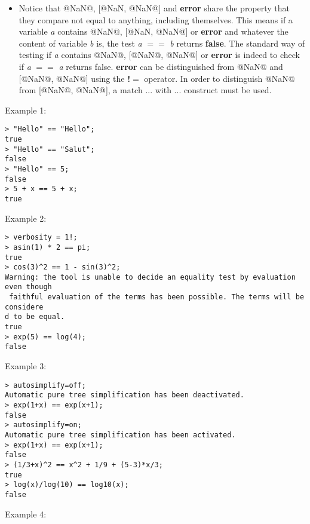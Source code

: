 \begin{itemize}
\item Notice that @NaN@, [@NaN, @NaN@] and \textbf{error} share the property that they
   compare not equal to anything, including themselves. This means if a variable
   \emph{a} contains @NaN@, [@NaN, @NaN@] or \textbf{error} and whatever the content of
   variable \emph{b} is, the test \emph{a} \textbf{$==$} \emph{b} returns \textbf{false}. The standard way of
   testing if \emph{a} contains @NaN@, [@NaN@, @NaN@] or \textbf{error} is indeed to check if
   \emph{a} \textbf{$==$} \emph{a} returns false. \textbf{error} can be distinguished from @NaN@ and
   [@NaN@, @NaN@] using the \textbf{!$=$} operator. In order to distinguish @NaN@ from
   [@NaN@, @NaN@], a match ... with ... construct must be used.
\end{itemize}
\noindent Example 1: 
\begin{center}\begin{minipage}{15cm}\begin{Verbatim}[frame=single]
> "Hello" == "Hello";
true
> "Hello" == "Salut";
false
> "Hello" == 5;
false
> 5 + x == 5 + x;
true
\end{Verbatim}
\end{minipage}\end{center}
\noindent Example 2: 
\begin{center}\begin{minipage}{15cm}\begin{Verbatim}[frame=single]
> verbosity = 1!;
> asin(1) * 2 == pi;
true
> cos(3)^2 == 1 - sin(3)^2;
Warning: the tool is unable to decide an equality test by evaluation even though
 faithful evaluation of the terms has been possible. The terms will be considere
d to be equal.
true
> exp(5) == log(4);
false
\end{Verbatim}
\end{minipage}\end{center}
\noindent Example 3: 
\begin{center}\begin{minipage}{15cm}\begin{Verbatim}[frame=single]
> autosimplify=off;
Automatic pure tree simplification has been deactivated.
> exp(1+x) == exp(x+1);
false
> autosimplify=on;
Automatic pure tree simplification has been activated.
> exp(1+x) == exp(x+1);
false
> (1/3+x)^2 == x^2 + 1/9 + (5-3)*x/3;
true
> log(x)/log(10) == log10(x);
false
\end{Verbatim}
\end{minipage}\end{center}
\noindent Example 4: 
